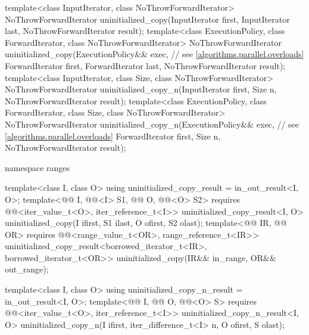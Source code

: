 \begin{codeblock}
{  template<class InputIterator, class NoThrowForwardIterator>
    NoThrowForwardIterator uninitialized_copy(InputIterator first, InputIterator last,
                                              NoThrowForwardIterator result);
  template<class ExecutionPolicy, class ForwardIterator, class NoThrowForwardIterator>
    NoThrowForwardIterator uninitialized_copy(ExecutionPolicy&& exec,   // see \ref{algorithms.parallel.overloads}
                                              ForwardIterator first, ForwardIterator last,
                                              NoThrowForwardIterator result);
  template<class InputIterator, class Size, class NoThrowForwardIterator>
    NoThrowForwardIterator uninitialized_copy_n(InputIterator first, Size n,
                                                NoThrowForwardIterator result);
  template<class ExecutionPolicy, class ForwardIterator, class Size,
           class NoThrowForwardIterator>
    NoThrowForwardIterator uninitialized_copy_n(ExecutionPolicy&& exec, // see \ref{algorithms.parallel.overloads}
                                                ForwardIterator first, Size n,
                                                NoThrowForwardIterator result);

  namespace ranges {
    template<class I, class O>
      using uninitialized_copy_result = in_out_result<I, O>;
    template<@@ I, @@<I> S1,
             @@ O, @@<O> S2>
      requires @@<iter_value_t<O>, iter_reference_t<I>>
        uninitialized_copy_result<I, O>
          uninitialized_copy(I ifirst, S1 ilast, O ofirst, S2 olast);
    template<@@ IR, @@ OR>
      requires @@<range_value_t<OR>, range_reference_t<IR>>
        uninitialized_copy_result<borrowed_iterator_t<IR>, borrowed_iterator_t<OR>>
          uninitialized_copy(IR&& in_range, OR&& out_range);

    template<class I, class O>
      using uninitialized_copy_n_result = in_out_result<I, O>;
    template<@@ I, @@ O, @@<O> S>
      requires @@<iter_value_t<O>, iter_reference_t<I>>
        uninitialized_copy_n_result<I, O>
          uninitialized_copy_n(I ifirst, iter_difference_t<I> n, O ofirst, S olast);
  }

}
\end{codeblock}

